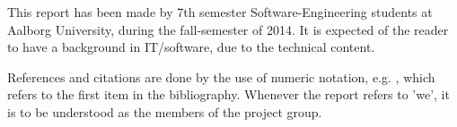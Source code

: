 This report has been made by 7th semester Software-Engineering students at Aalborg University, during the fall-semester of 2014.
It is expected of the reader to have a background in IT/software, due to the technical content.

References and citations are done by the use of numeric notation, e.g. \cite{aalborgbycyklenbagcyklen}, which refers to the first item in the bibliography.
Whenever the report refers to 'we', it is to be understood as the members of the project group.